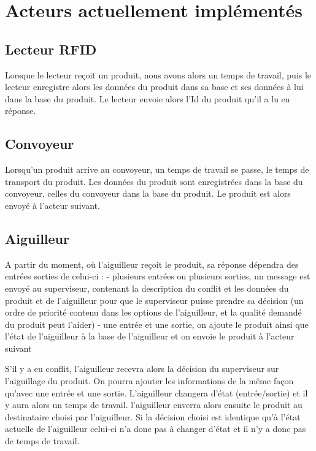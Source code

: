 \documentclass[12pt,a4paper]{article}
\begin{document}
	\section{Acteurs actuellement implémentés}
	
		\subsection{Lecteur RFID}
		 	Lorsque le lecteur reçoit un produit, nous avons alors un temps de 
		 	travail, puis le lecteur enregistre alors les données du produit dans 
		 	sa base et ses données à lui dans la base du produit. Le lecteur envoie 
		 	alors l'Id du produit qu'il a lu en réponse.
		 
		\subsection{Convoyeur}
			Lorsqu'un produit arrive au convoyeur, un temps de travail se passe, 
			le temps de transport du produit. Les données du produit sont 
			enregistrées dans la base du convoyeur, celles du convoyeur dans la 
			base du produit. Le produit est alors envoyé à l'acteur suivant.

		\subsection{Aiguilleur}
			A partir du moment, où l'aiguilleur reçoit le produit, sa réponse 
			dépendra des entrées sorties de celui-ci : 
			- plusieurs entrées ou plusieurs sorties, un message est envoyé au 
			superviseur, contenant la description du conflit et les données du 
			produit et de l'aiguilleur pour que le superviseur puisse prendre 
			sa décision (un ordre de priorité contenu dans les options de 
			l'aiguilleur, et la qualité demandé du produit peut l'aider)
			- une entrée et une sortie, on ajoute le produit ainsi que l'état de 
			l'aiguilleur à la base de l'aiguilleur et on envoie 
			le produit à l'acteur suivant
			
			S'il y a eu conflit, l'aiguilleur recevra alors la décision du 
			superviseur sur l'aiguillage du produit. On pourra ajouter les 
			informations de la même façon qu'avec une entrée et une sortie. 
			L'aiguilleur changera d'état (entrée/sortie) et il y aura alors un 
			temps de travail. l'aiguilleur enverra alors ensuite le produit au 
			destinataire choisi par l'aiguilleur. Si la décision choisi est 
			identique qu'à l'état actuelle de l'aiguilleur celui-ci n'a donc pas 
			à changer d'état et il n'y a donc pas de temps de travail.
\end{document}
